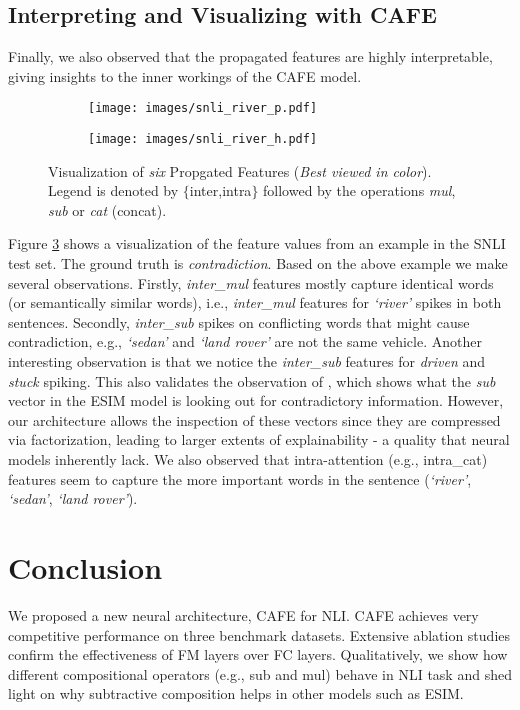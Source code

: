 \documentclass[11pt,a4paper]{article}
\begin{document}
\subsection{Interpreting and Visualizing with CAFE}

Finally, we also observed that the propagated features are highly interpretable, giving insights to the inner workings of the CAFE model.
\begin{figure}[ht!]
  \centering
 \begin{subfigure}[b]{0.44\textwidth}
   \texttt{[image: images/snli\_river\_p.pdf]}
   \label{fig:ex1a}
\end{subfigure}
\vspace{-1em}
\begin{subfigure}[b]{0.44\textwidth}
   \texttt{[image: images/snli\_river\_h.pdf]}
   \label{fig:ex1bb}
\end{subfigure}
\caption{Visualization of \textit{six} Propgated Features (\textit{Best viewed in color}). Legend is denoted by $\{$inter,intra$\}$ followed by the operations \textit{mul}, \textit{sub} or \textit{cat} (concat).} \label{cafe_analysis}
\end{figure}
Figure \ref{cafe_analysis} shows a visualization of the feature values from an example in the SNLI test set. The ground truth is \textit{contradiction}. Based on the above example we make several observations. Firstly, \textit{inter\_mul} features mostly capture identical words (or semantically similar words), i.e., \textit{inter\_mul} features for \textit{`river'} spikes in both sentences. Secondly, \textit{inter\_sub} spikes on conflicting words that might cause contradiction, e.g., \textit{`sedan'} and \textit{`land rover'} are not the same vehicle. Another interesting observation is that we notice the \textit{inter\_sub} features for \textit{driven} and \textit{stuck} spiking. This also validates the observation of \cite{DBLP:conf/acl/ChenZLWJI17}, which shows what the \textit{sub} vector in the ESIM model is looking out for contradictory information. However, our architecture allows the inspection of these vectors since they are compressed via factorization, leading to larger extents of explainability - a quality that neural models inherently lack. We also observed that intra-attention (e.g., intra\_cat) features seem to capture the more important words in the sentence (\textit{`river'}, \textit{`sedan'}, \textit{`land rover'}).



\section{Conclusion}
We proposed a new neural architecture, CAFE for NLI. CAFE achieves very competitive performance on three
benchmark datasets. Extensive ablation studies confirm the effectiveness of FM layers over FC layers. Qualitatively, we show how different compositional operators (e.g., sub and mul) behave in NLI task and shed light on why subtractive composition helps in other models such as ESIM.





\end{document}
